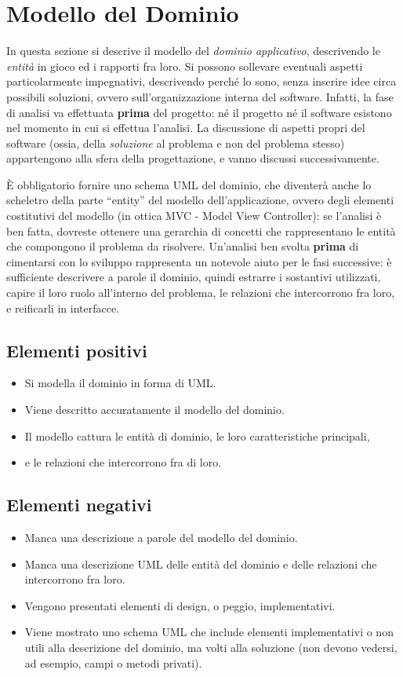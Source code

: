 \documentclass[a4paper,12pt]{report}
\begin{document}
\section{Modello del Dominio}

In questa sezione si descrive il modello del \textit{dominio
applicativo}, descrivendo le \textit{entità} in gioco ed i rapporti fra loro.
%
Si possono sollevare eventuali aspetti particolarmente impegnativi, descrivendo perché lo sono, senza inserire idee circa possibili soluzioni, ovvero sull'organizzazione interna del software.
%
Infatti, la fase di analisi va effettuata \textbf{prima} del progetto: né il progetto né il software esistono nel momento in cui si effettua l'analisi.
%
La discussione di aspetti propri del software (ossia, della \textit{soluzione} al problema e non del problema stesso) appartengono alla sfera della progettazione, e vanno discussi successivamente.

È obbligatorio fornire uno schema UML del dominio, che diventerà anche lo scheletro della
parte ``entity'' del modello dell'applicazione, ovvero degli elementi costitutivi del modello (in ottica MVC - Model View Controller): se l'analisi è ben fatta, dovreste ottenere una gerarchia di concetti che rappresentano le entità che compongono il problema da risolvere.
%
Un'analisi ben svolta \textbf{prima} di cimentarsi con lo sviluppo rappresenta un notevole aiuto per
le fasi successive: è sufficiente descrivere a parole il dominio, quindi estrarre i sostantivi
utilizzati, capire il loro ruolo all'interno del problema, le relazioni che intercorrono fra loro, e
reificarli in interfacce.

\subsection*{Elementi positivi}
\begin{itemize}
	\item Si modella il dominio in forma di UML\@.
	\item Viene descritto accuratamente il modello del dominio.
	\item Il modello cattura le entità di dominio, le loro caratteristiche principali,
	\item e le relazioni che intercorrono fra di loro.
\end{itemize}

\subsection*{Elementi negativi}
\begin{itemize}
	\item Manca una descrizione a parole del modello del dominio.
	\item Manca una descrizione UML delle entità del dominio e delle relazioni che intercorrono fra loro.
	\item Vengono presentati elementi di design, o peggio, implementativi.
	\item Viene mostrato uno schema UML che include elementi implementativi o non utili alla descrizione del dominio,
	ma volti alla soluzione (non devono vedersi, ad esempio, campi o metodi privati).
\end{itemize}
\end{document}
